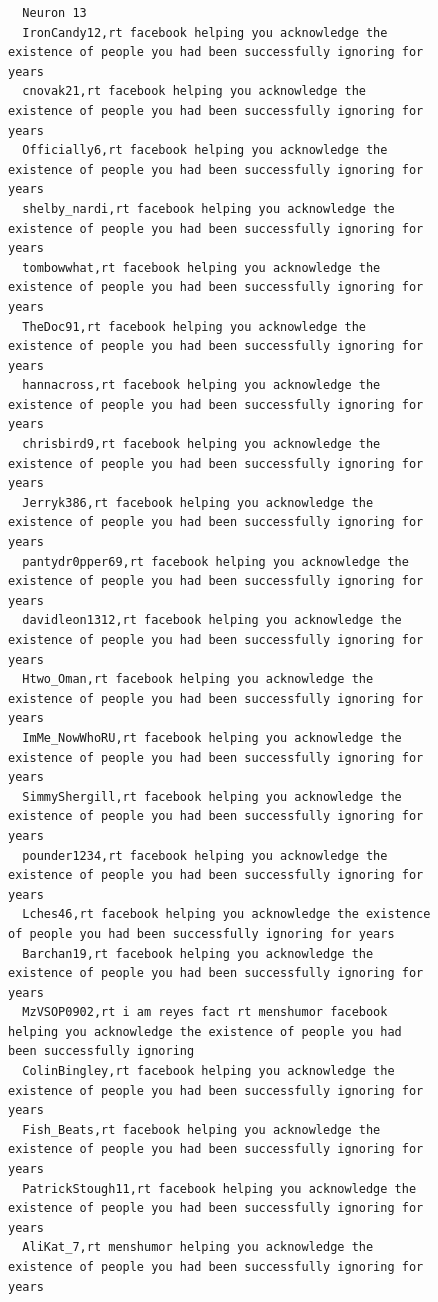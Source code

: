 \begin{figure}[htpb]
\begin{verbatim}
  Neuron 13
  IronCandy12,rt facebook helping you acknowledge the existence of people you had been successfully ignoring for years
  cnovak21,rt facebook helping you acknowledge the existence of people you had been successfully ignoring for years
  Officially6,rt facebook helping you acknowledge the existence of people you had been successfully ignoring for years
  shelby_nardi,rt facebook helping you acknowledge the existence of people you had been successfully ignoring for years
  tombowwhat,rt facebook helping you acknowledge the existence of people you had been successfully ignoring for years
  TheDoc91,rt facebook helping you acknowledge the existence of people you had been successfully ignoring for years
  hannacross,rt facebook helping you acknowledge the existence of people you had been successfully ignoring for years
  chrisbird9,rt facebook helping you acknowledge the existence of people you had been successfully ignoring for years
  Jerryk386,rt facebook helping you acknowledge the existence of people you had been successfully ignoring for years
  pantydr0pper69,rt facebook helping you acknowledge the existence of people you had been successfully ignoring for years
  davidleon1312,rt facebook helping you acknowledge the existence of people you had been successfully ignoring for years
  Htwo_Oman,rt facebook helping you acknowledge the existence of people you had been successfully ignoring for years
  ImMe_NowWhoRU,rt facebook helping you acknowledge the existence of people you had been successfully ignoring for years
  SimmyShergill,rt facebook helping you acknowledge the existence of people you had been successfully ignoring for years
  pounder1234,rt facebook helping you acknowledge the existence of people you had been successfully ignoring for years
  Lches46,rt facebook helping you acknowledge the existence of people you had been successfully ignoring for years
  Barchan19,rt facebook helping you acknowledge the existence of people you had been successfully ignoring for years
  MzVSOP0902,rt i am reyes fact rt menshumor facebook helping you acknowledge the existence of people you had been successfully ignoring
  ColinBingley,rt facebook helping you acknowledge the existence of people you had been successfully ignoring for years
  Fish_Beats,rt facebook helping you acknowledge the existence of people you had been successfully ignoring for years
  PatrickStough11,rt facebook helping you acknowledge the existence of people you had been successfully ignoring for years
  AliKat_7,rt menshumor helping you acknowledge the existence of people you had been successfully ignoring for years

\end{verbatim}
\end{figure}
